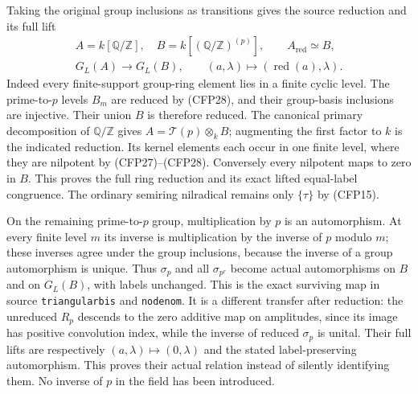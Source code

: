 Taking the original group inclusions
as transitions gives the source
reduction and its full lift
\begin{equation}\tag{CFP30}
\begin{gathered}
 A=k[\mathbb Q/\mathbb Z],\quad
 B=k[(\mathbb Q/\mathbb Z)^{(p)}],\qquad
 A_{\mathrm{red}}\simeq B,\\
 G_L(A)\longrightarrow G_L(B),\qquad
             (a,\lambda)\longmapsto(\operatorname{red}(a),\lambda).
\end{gathered}
\end{equation}
Indeed every finite-support group-ring
element lies in a finite cyclic level.
The prime-to-$p$ levels $B_m$ are reduced
by (CFP28), and their group-basis
inclusions are injective. Their union
$B$ is therefore reduced. The canonical
primary decomposition of $\mathbb Q/\mathbb Z$
gives $A=\mathcal T(p)\otimes_k B$;
augmenting the first factor to $k$
is the indicated reduction. Its kernel
elements each occur in one finite
level, where they are nilpotent by
(CFP27)--(CFP28). Conversely every
nilpotent maps to zero in $B$. This
proves the full ring reduction and
its exact lifted equal-label congruence.
The ordinary semiring nilradical
remains only $\{\tau\}$ by (CFP15).

On the remaining prime-to-$p$ group,
multiplication by $p$ is an automorphism.
At every finite level $m$ its inverse
is multiplication by the inverse of
$p$ modulo $m$; these inverses agree
under the group inclusions, because
the inverse of a group automorphism
is unique. Thus $\sigma_p$ and all
$\sigma_{p^r}$ become actual
automorphisms on $B$ and on $G_L(B)$,
with labels unchanged. This is the
exact surviving map in source
\texttt{triangularbis} and \texttt{nodenom}.
It is a different transfer after
reduction: the unreduced $R_p$
descends to the zero additive map
on amplitudes, since its image has
positive convolution index, while
the inverse of reduced $\sigma_p$
is unital. Their full lifts are
respectively $(a,\lambda)\mapsto(0,\lambda)$
and the stated label-preserving
automorphism. This proves their
actual relation instead of silently
identifying them. No inverse of $p$
in the field has been introduced.

